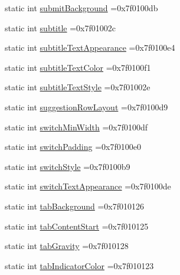 \begin{DoxyCompactItemize}
\item 
static int \hyperlink{classandroid_1_1support_1_1v7_1_1mediarouter_1_1R_1_1attr_a49c44635804f56e76dc9ee2f70f461fc}{submit\+Background} =0x7f0100db
\item 
static int \hyperlink{classandroid_1_1support_1_1v7_1_1mediarouter_1_1R_1_1attr_a66bf2c904966e1bb3cca8099c7dc3882}{subtitle} =0x7f01002c
\item 
static int \hyperlink{classandroid_1_1support_1_1v7_1_1mediarouter_1_1R_1_1attr_a04ae58aea15169a54ecf53faabb46f36}{subtitle\+Text\+Appearance} =0x7f0100e4
\item 
static int \hyperlink{classandroid_1_1support_1_1v7_1_1mediarouter_1_1R_1_1attr_ac92a9bbf6e485bae5fbbbbea6f8a2dd9}{subtitle\+Text\+Color} =0x7f0100f1
\item 
static int \hyperlink{classandroid_1_1support_1_1v7_1_1mediarouter_1_1R_1_1attr_a44538ca09d79d732baf7e183450e704c}{subtitle\+Text\+Style} =0x7f01002e
\item 
static int \hyperlink{classandroid_1_1support_1_1v7_1_1mediarouter_1_1R_1_1attr_a7753b1cfb63c3bcdc0b823c703ca27d2}{suggestion\+Row\+Layout} =0x7f0100d9
\item 
static int \hyperlink{classandroid_1_1support_1_1v7_1_1mediarouter_1_1R_1_1attr_aa47dc02fb71f6a3ef5a758229456828c}{switch\+Min\+Width} =0x7f0100df
\item 
static int \hyperlink{classandroid_1_1support_1_1v7_1_1mediarouter_1_1R_1_1attr_a001d27a3e0d1776fea64d26a770af4a5}{switch\+Padding} =0x7f0100e0
\item 
static int \hyperlink{classandroid_1_1support_1_1v7_1_1mediarouter_1_1R_1_1attr_a8256dc7bd973274b19cb4aeb043d03a5}{switch\+Style} =0x7f0100b9
\item 
static int \hyperlink{classandroid_1_1support_1_1v7_1_1mediarouter_1_1R_1_1attr_ab2bb1fa141648601404a2b2b2462acf9}{switch\+Text\+Appearance} =0x7f0100de
\item 
static int \hyperlink{classandroid_1_1support_1_1v7_1_1mediarouter_1_1R_1_1attr_aeb75b51613a16cdb79557607930714a1}{tab\+Background} =0x7f010126
\item 
static int \hyperlink{classandroid_1_1support_1_1v7_1_1mediarouter_1_1R_1_1attr_af723b082e7ee1fd2f3336ef0f0c67681}{tab\+Content\+Start} =0x7f010125
\item 
static int \hyperlink{classandroid_1_1support_1_1v7_1_1mediarouter_1_1R_1_1attr_af2a23c12df456b47f80096e89092fabd}{tab\+Gravity} =0x7f010128
\item 
static int \hyperlink{classandroid_1_1support_1_1v7_1_1mediarouter_1_1R_1_1attr_a5fa8ac9760622b42329186cf71b2cee1}{tab\+Indicator\+Color} =0x7f010123

\end{DoxyCompactItemize}
